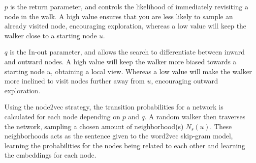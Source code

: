 $p$ is the return parameter, and controls the likelihood of immediately revisiting a node in the walk. A high value ensures that you are less likely to sample an already visited node, encouraging exploration, whereas a low value will keep the walker close to a starting node $u$.

$q$ is the In-out parameter, and allows the search to differentiate between inward and outward nodes. A high value will keep the walker more biased towards a starting node $u$, obtaining a local view. Whereas a low value will make the walker more inclined to visit nodes further away from $u$, encouraging outward exploration.

Using the node2vec strategy, the transition probabilities for a network is calculated for each node depending on $p$ and $q$. A random walker then traverses the network, sampling a chosen amount of neighborhood(s) $N_s(u)$. These neighborhoods acts as the sentence given to the word2vec skip-gram model, learning the probabilities for the nodes being related to each other and learning the embeddings for each node.
